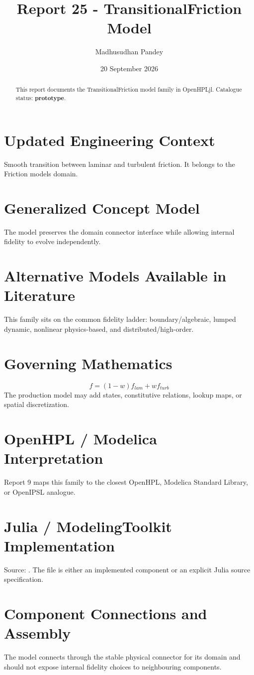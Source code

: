 \documentclass[10pt,a4paper]{article}
\title{Report 25 - TransitionalFriction Model}
\author{Madhusudhan Pandey}
\date{20 September 2026}
\begin{document}
\maketitle
\begin{abstract}This report documents the TransitionalFriction model family in OpenHPLjl. Catalogue status: \textbf{prototype}.\end{abstract}
\section{Updated Engineering Context}Smooth transition between laminar and turbulent friction. It belongs to the Friction models domain.
\section{Generalized Concept Model}The model preserves the domain connector interface while allowing internal fidelity to evolve independently.
\section{Alternative Models Available in Literature}This family sits on the common fidelity ladder: boundary/algebraic, lumped dynamic, nonlinear physics-based, and distributed/high-order.
\section{Governing Mathematics}\[f=(1-w)f_{lam}+wf_{turb}\]The production model may add states, constitutive relations, lookup maps, or spatial discretization.
\section{OpenHPL / Modelica Interpretation}Report 9 maps this family to the closest OpenHPL, Modelica Standard Library, or OpenIPSL analogue.
\section{Julia / ModelingToolkit Implementation}Source: \texttt{}. The file is either an implemented component or an explicit Julia source specification.
\section{Component Connections and Assembly}The model connects through the stable physical connector for its domain and should not expose internal fidelity choices to neighbouring components.
\end{document}
